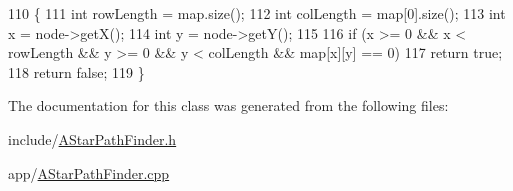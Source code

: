 \begin{DoxyCode}
110                                                                     \{
111   \textcolor{keywordtype}{int} rowLength = map.size();
112   \textcolor{keywordtype}{int} colLength = map[0].size();
113   \textcolor{keywordtype}{int} x = node->getX();
114   \textcolor{keywordtype}{int} y = node->getY();
115 
116   \textcolor{keywordflow}{if} (x >= 0 && x < rowLength && y >= 0 && y < colLength && map[x][y] == 0)
117     \textcolor{keywordflow}{return} \textcolor{keyword}{true};
118   \textcolor{keywordflow}{return} \textcolor{keyword}{false};
119 \}
\end{DoxyCode}


The documentation for this class was generated from the following files\+:\begin{DoxyCompactItemize}
\item 
include/\hyperlink{AStarPathFinder_8h}{A\+Star\+Path\+Finder.\+h}\item 
app/\hyperlink{AStarPathFinder_8cpp}{A\+Star\+Path\+Finder.\+cpp}\end{DoxyCompactItemize}
